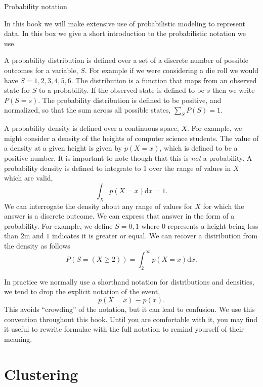 \begin{boxfloat}
  \caption{Probability notation}\label{box:probability}

  \boxfontsize In this book we will make extensive use of
  probabilistic modeling to represent data. In this box we give a
  short introduction to the probabilistic notation we use.

  A probability distribution is defined over a set of a discrete
  number of possible outcomes for a variable, $S$. For example if we
  were considering a die roll we would have $S={1,2,3,4,5,6}$. The
  distribution is a function that maps from an observed state for $S$
  to a probability. If the observed state is defined to be $s$ then we
  write $P(S=s)$. The probability distribution is defined to be
  positive, and normalized, so that the sum across all possible
  states, $\sum_{S}P(S)=1$.

  A probability density is defined over a continuous space, $X$. For
  example, we might consider a density of the heights of computer
  science students. The value of a density at a given height is given
  by $p(X=x)$, which is defined to be a positive number. It is
  important to note though that this is \emph{not} a probability. A
  probability density is defined to integrate to 1 over the range of
  values in $X$ which are valid,
  \[
  \int_X p(X=x) \text{d}x = 1.
  \]
  We can interrogate the density about any range of values for $X$ for
  which the answer is a discrete outcome. We can express that answer
  in the form of a probability. For example, we define $S={0,1}$ where
  $0$ represents a height being less than $2\text{m}$ and $1$
  indicates it is greater or equal. We can recover a distribution from
  the density as follows
  \[
  P(S=(X\geq 2)) = \int_{2}^\infty p(X=x) \text{d}x.
  \]

  In practice we normally use a shorthand notation for distributions
  and densities, we tend to drop the explicit notation of the event,
  \[
  p(X=x)\equiv p(x).
  \]
  This avoids ``crowding'' of the notation, but it can lead to
  confusion. We use this convention throughout this book. Until you
  are comfortable with it, you may find it useful to rewrite formulae
  with the full notation to remind yourself of their meaning.
\end{boxfloat}

\section{Clustering}

